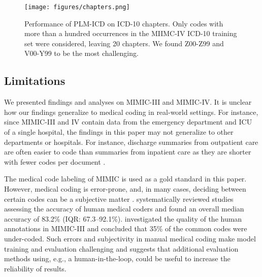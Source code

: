 \documentclass[anonymous=false, sigconf=true, review=false, natbib=true]{acmart}
\begin{document}
\begin{figure}[t]
    \centering
    \texttt{[image: figures/chapters.png]}
    \caption{Performance of PLM-ICD on ICD-10 chapters. Only codes with more than a hundred occurrences in the MIIMC-IV ICD-10 training set were considered, leaving 20 chapters. We found Z00-Z99 and V00-Y99 to be the most challenging.}
    \label{fig:chapter_performance}
\end{figure}

\subsection{Limitations}
We presented findings and analyses on MIMIC-III and MIMIC-IV. It is unclear how our findings generalize to medical coding in real-world settings.
For instance, since MIMIC-III and IV contain data from the emergency department and ICU of a single hospital, the findings in this paper may not generalize to other departments or hospitals. 
For instance, discharge summaries from outpatient care are often easier to code than summaries from inpatient care as they are shorter with fewer codes per document \cite{zhangBERTXMLLargeScale2020, liuEffectiveConvolutionalAttention2021, tsengAdministrativeCostsAssociated2018}.

The medical code labeling of MIMIC is used as a gold standard in this paper. However, medical coding is error-prone, and, in many cases, deciding between certain codes can be a subjective matter \cite{nouraeiAuditNatureImpact2013, lloydPhysicianCodingErrors1985}. \citet{burnsSystematicReviewDischarge2012} systematically reviewed studies assessing the accuracy of human medical coders and found an overall median accuracy of 83.2\% (IQR: 67.3–92.1\%). \citet{searleExperimentalEvaluationDevelopment2020} investigated the quality of the human annotations in MIMIC-III and concluded that 35\% of the common codes were under-coded. Such errors and subjectivity in manual medical coding make model training and evaluation challenging and suggests that additional evaluation methods using, e.g., a human-in-the-loop, could be useful to increase the reliability of results. 
\end{document}
